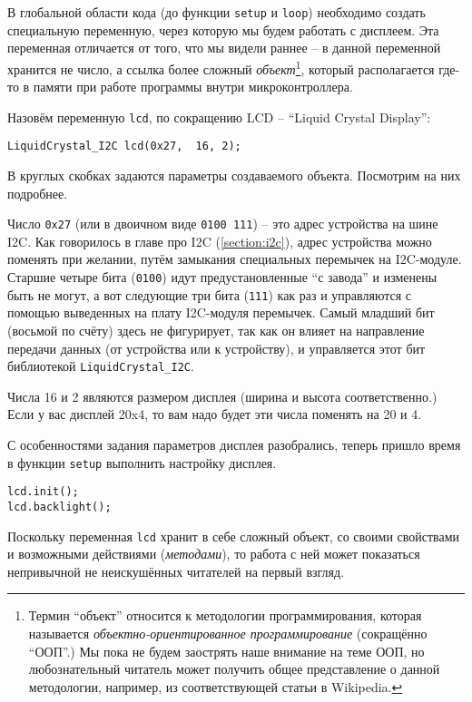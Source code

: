 \documentclass[../sparc.tex]{subfiles}
\begin{document}
В глобальной области кода (до функции \texttt{setup} и \texttt{loop}) необходимо
создать специальную переменную, через которую мы будем работать с дисплеем. Эта
переменная отличается от того, что мы видели раннее -- в данной переменной
хранится не число, а ссылка более сложный \emph{объект}\footnote{Термин
``объект'' относится к методологии программирования, которая называется
\emph{объектно-ориентированное программирование} (сокращённо ``ООП''.)  Мы пока
не будем заострять наше внимание на теме ООП, но любознательный читатель может
получить общее представление о данной методологии, например, из соответствующей
статьи в Wikipedia.}, который располагается где-то в памяти при работе программы
внутри микроконтроллера.

Назовём переменную \texttt{lcd}, по сокращению \gls{LCD} -- ``Liquid Crystal
Display'':

\begin{verbatim}
LiquidCrystal_I2C lcd(0x27,  16, 2);
\end{verbatim}

В круглых скобках задаются параметры создаваемого объекта.  Посмотрим на них
подробнее.

Число \texttt{0x27} (или в двоичном виде \texttt{0100 111}) -- это адрес
устройства на шине I2C.  Как говорилось в главе про I2C (\ref{section:i2c}),
адрес устройства можно поменять при желании, путём замыкания специальных
перемычек на I2C-модуле.  Старшие четыре бита (\texttt{0100}) идут
предустановленные ``с завода'' и изменены быть не могут, а вот следующие три
бита (\texttt{111}) как раз и управляются с помощью выведенных на плату
I2C-модуля перемычек.  Самый младший бит (восьмой по счёту) здесь не фигурирует,
так как он влияет на направление передачи данных (от устройства или к
устройству), и управляется этот бит библиотекой \texttt{LiquidCrystal\_I2C}.

Числа 16 и 2 являются размером дисплея (ширина и высота соответственно.)  Если у
вас дисплей 20x4, то вам надо будет эти числа поменять на 20 и 4.

С особенностями задания параметров дисплея разобрались, теперь пришло время в
функции \texttt{setup} выполнить настройку дисплея.

\begin{verbatim}
lcd.init();
lcd.backlight();
\end{verbatim}

Поскольку переменная \texttt{lcd} хранит в себе сложный объект, со своими
свойствами и возможными действиями (\emph{методами}), то работа с ней может показаться
непривычной не неискушённых читателей на первый взгляд.
\end{document}
